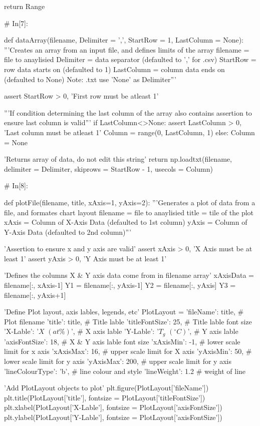 \documentclass[a4paper,8pt]{article}
\begin{document}
\begin{python}
return Range


# In[7]:

def dataArray(filename, Delimiter = ',', StartRow = 1, LastColumn = None):
'''Creates an array from an input file, and defines limits of the array
filename = file to anaylisied
Delimiter = data separator (defaulted to ',' for .csv)
StartRow = row data starts on (defaulted to 1)
LastColumn = column data ends on (defaulted to None)
Note: .txt use 'None' as Delimiter'''

assert StartRow > 0, 'First row must be atleast 1'

'''If condition determining the last column of the array
also contains assertion to ensure last column is valid'''
if LastColumn<>None:
assert LastColumn > 0, 'Last column must be atleast 1'
Column = range(0, LastColumn, 1)
else:
Column = None

'Returns array of data, do not edit this string'
return np.loadtxt(filename, delimiter = Delimiter,
skiprows = StartRow - 1, 
usecols = Column)


# In[8]:

def plotFile(filename, title, xAxis=1, yAxis=2):
'''Generates a plot of data from a file, and formates chart layout
filename = file to anaylisied
title = tile of the plot
xAxis = Column of X-Axis Data (defaulted to 1st column)
yAxis = Column of Y-Axis Data (defaulted to 2nd column)'''

'Assertion to ensure x and y axis are valid'
assert xAxis > 0, 'X Axis must be at least 1'
assert yAxis > 0, 'Y Axis must be at least 1'

'Defines the columns X & Y axis data come from in filename array'
xAxisData = filename[:, xAxis-1]
Y1 = filename[:, yAxis-1]
Y2 = filename[:, yAxis]
Y3 = filename[:, yAxis+1]

'Define Plot layout, axis lables, legends, etc'
PlotLayout = {'fileName': title, # Plot filename 
	'title': title, # Title lable
	'titleFontSize': 25, # Title lable font size
	'X-Lable': '$X$ $(at\%)$', # X axis lable
	'Y-Lable': '$T_{g}$  $(^{\circ}C)$', # Y axis lable
	'axisFontSize': 18, # X & Y axis lable font size
	'xAxisMin': -1, # lower scale limit for x axis
	'xAxisMax': 16, # upper scale limit for X axis
	'yAxisMin': 50, # lower scale limit for y axis
	'yAxisMax': 200, # upper scale limit for y axis
	'lineColourType': 'b', # line colour and style
	'lineWeight': 1.2 # weight of line
}

'Add PlotLayout objects to plot'
plt.figure(PlotLayout['fileName'])
plt.title(PlotLayout['title'], fontsize = PlotLayout['titleFontSize'])
plt.xlabel(PlotLayout['X-Lable'], fontsize = PlotLayout['axisFontSize'])
plt.ylabel(PlotLayout['Y-Lable'], fontsize = PlotLayout['axisFontSize'])




\end{python}
\end{document}

